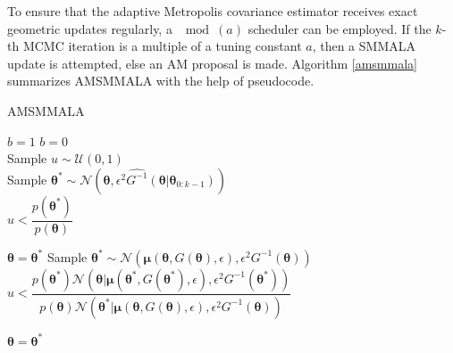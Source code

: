 \documentclass[twoside,11pt]{article}
\begin{document}
{To ensure that the adaptive Metropolis covariance estimator receives exact geometric updates regularly, a $\mod{(a)}$ 
scheduler can be employed. If the $k$-th MCMC iteration is a multiple of a tuning constant $a$, then a SMMALA update is 
attempted, else an AM proposal is made. Algorithm \ref{amsmmala} summarizes AMSMMALA with the help of pseudocode.

\begin{algorithm}[t]
	\caption{AMSMMALA}
	\label{amsmmala}
	\begin{algorithmic}
		  \State $b = 1$
		\Else
		  \State $b = 0$
		\EndIf\\
		
		\State Sample $u\sim\mathcal{U}(0, 1)$\\
		
		 
		\State Sample 
		$\boldsymbol{\theta^{*}}
		\sim\mathcal{N}(\boldsymbol{\theta},
		\epsilon^2 \widehat{G^{-1}}(\boldsymbol{\theta}|\boldsymbol{\theta}_{0:k-1}))
		$\\
		
		\If
		{
			$u<\dfrac{p(\boldsymbol{\theta}^{*})}{p(\boldsymbol{\theta})}$
		}
		
		\State $\boldsymbol{\theta}=\boldsymbol{\theta}^{*}$
		\EndIf
		 
		\State Sample 
		$\boldsymbol{\theta^{*}}
		\sim\mathcal{N}(\boldsymbol{\mu}(\boldsymbol{\theta}, G(\boldsymbol{\theta}), \epsilon),
		\epsilon^2 G^{-1}(\boldsymbol{\theta}))
		$\\
		
		\If
		{
			$u<\dfrac{
				p(\boldsymbol{\theta}^{*})
				\mathcal{N}(\boldsymbol{\theta}|
				\boldsymbol{\mu}(\boldsymbol{\theta}^{*},
				G(\boldsymbol{\theta}^{*}),
				\epsilon),
				\epsilon^2 G^{-1}(\boldsymbol{\theta}^{*}))
			}
			{
				p(\boldsymbol{\theta})
				\mathcal{N}(\boldsymbol{\theta}^{*}|
				\boldsymbol{\mu}(\boldsymbol{\theta},
				G(\boldsymbol{\theta}),
				\epsilon),
				\epsilon^2 G^{-1}(\boldsymbol{\theta}))
			}$
		}
		
		\State $\boldsymbol{\theta}=\boldsymbol{\theta}^{*}$
		\EndIf
		\EndIf
		
		\EndFor
	\end{algorithmic}
\end{algorithm}

}
\end{document}
